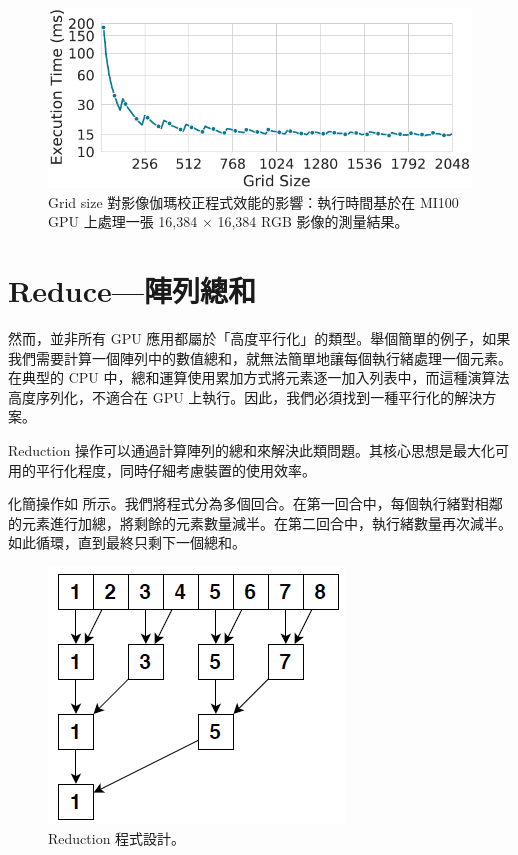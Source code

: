 \begin{figure}[h]
    \centering
    \includegraphics[width=0.9\linewidth]{FileAusiliari/Screenshots/Figure8-4.png}
    \caption{Grid size 對影像伽瑪校正程式效能的影響：執行時間基於在 MI100 GPU 上處理一張 16,384 × 16,384 RGB 影像的測量結果。}
    \label{fig:GridSize}
\end{figure}

\section{Reduce—陣列總和}
然而，並非所有 GPU 應用都屬於「高度平行化」的類型。舉個簡單的例子，如果我們需要計算一個陣列中的數值總和，就無法簡單地讓每個執行緒處理一個元素。在典型的 CPU 中，總和運算使用累加方式將元素逐一加入列表中，而這種演算法高度序列化，不適合在 GPU 上執行。因此，我們必須找到一種平行化的解決方案。

Reduction 操作可以通過計算陣列的總和來解決此類問題。其核心思想是最大化可用的平行化程度，同時仔細考慮裝置的使用效率。

化簡操作如  所示。我們將程式分為多個回合。在第一回合中，每個執行緒對相鄰的元素進行加總，將剩餘的元素數量減半。在第二回合中，執行緒數量再次減半。如此循環，直到最終只剩下一個總和。

\begin{figure}[h]
    \centering
    \includegraphics[width=0.4\linewidth]{FileAusiliari/Screenshots/Figure8-5.png}
    \caption{Reduction 程式設計。}
    \label{fig:reduce}
\end{figure}

